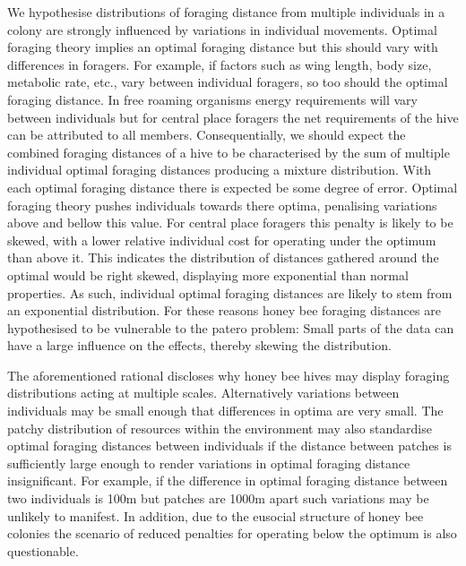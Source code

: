 \documentclass[11pt,usenames,dvipsnames]{article}
\begin{document}
We hypothesise distributions of foraging distance from multiple individuals in a colony are strongly influenced by variations in individual movements. Optimal foraging theory implies an optimal foraging distance but this should vary with differences in foragers. For example, if factors such as wing length, body size, metabolic rate, etc., vary between individual foragers, so too should the optimal foraging distance. In free roaming organisms energy requirements will vary between individuals but for central place foragers the net requirements of the hive can be attributed to all members. Consequentially, we should expect the combined foraging distances of a hive to be characterised by the sum of multiple individual optimal foraging distances producing a mixture distribution. With each optimal foraging distance there is expected be some degree of error. Optimal foraging theory pushes individuals towards there optima, penalising variations above and bellow this value. For central place foragers this penalty is likely to be skewed, with a lower relative individual cost for operating under the optimum than above it. This indicates the distribution of distances gathered around the optimal would be right skewed, displaying more exponential than normal properties. As such, individual optimal foraging distances are likely to stem from an exponential distribution. For these reasons honey bee foraging distances are hypothesised to be vulnerable to the patero problem: Small parts of the data can have a large influence on the effects, thereby skewing the distribution.  

The aforementioned rational discloses why honey bee hives may display foraging distributions acting at multiple scales. Alternatively variations between individuals may be small enough that differences in optima are very small. The patchy distribution of resources within the environment may also standardise optimal foraging distances between individuals if the distance between patches is sufficiently large enough to render variations in optimal foraging distance insignificant. For example, if the difference in optimal foraging distance between two individuals is 100m but patches are 1000m apart such variations may be unlikely to manifest. In addition, due to the eusocial structure of honey bee colonies the scenario of reduced penalties for operating below the optimum is also questionable.  
\end{document}
